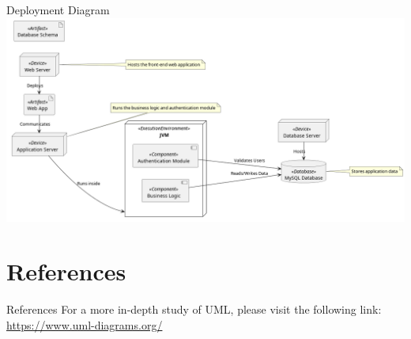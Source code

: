 \documentclass[aspectratio=169, table]{beamer}
\begin{document}
\begin{frame}{Deployment Diagram}
	\vspace{30pt}
	\centering
	\includegraphics[width=\textwidth]{../../figures/out/deployment_diagram.png}
\end{frame}

\section{References}

\begin{frame}{References}
	\vspace{20pt}
	For a more in-depth study of UML, please visit the following link:  
	\url{https://www.uml-diagrams.org/}
\end{frame}
\end{document}
